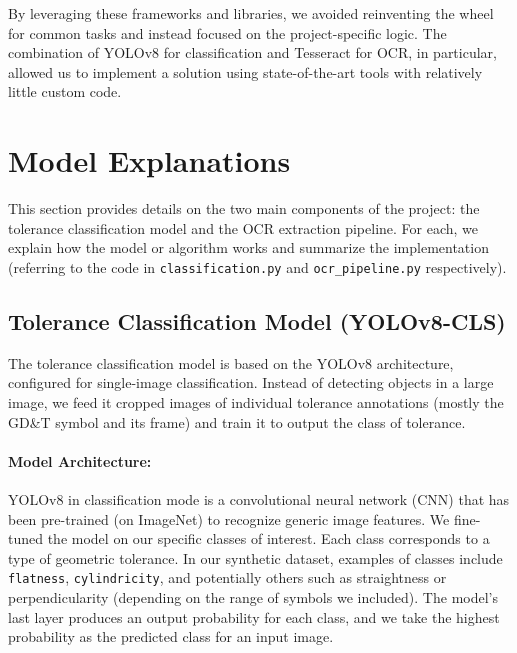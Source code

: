 \documentclass[11pt,a4paper]{article}
\begin{document}
By leveraging these frameworks and libraries, we avoided reinventing the wheel for common tasks and instead focused on the project-specific logic. The combination of YOLOv8 for classification and Tesseract for OCR, in particular, allowed us to implement a solution using state-of-the-art tools with relatively little custom code.

\section{Model Explanations}
This section provides details on the two main components of the project: the tolerance classification model and the OCR extraction pipeline. For each, we explain how the model or algorithm works and summarize the implementation (referring to the code in \verb|classification.py| and \verb|ocr_pipeline.py| respectively).

\subsection{Tolerance Classification Model (YOLOv8-CLS)}
The tolerance classification model is based on the YOLOv8 architecture, configured for single-image classification. Instead of detecting objects in a large image, we feed it cropped images of individual tolerance annotations (mostly the GD\&T symbol and its frame) and train it to output the class of tolerance.

\paragraph{Model Architecture:} YOLOv8 in classification mode is a convolutional neural network (CNN) that has been pre-trained (on ImageNet) to recognize generic image features. We fine-tuned the model on our specific classes of interest. Each class corresponds to a type of geometric tolerance. In our synthetic dataset, examples of classes include \texttt{flatness}, \texttt{cylindricity}, and potentially others such as straightness or perpendicularity (depending on the range of symbols we included). The model’s last layer produces an output probability for each class, and we take the highest probability as the predicted class for an input image.
\end{document}
